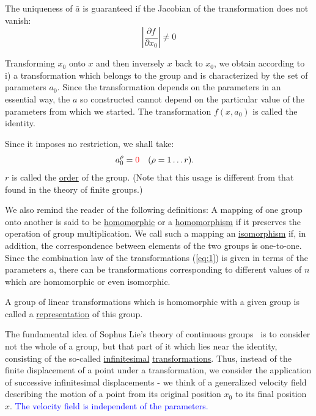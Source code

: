The uniqueness of \(\bar{a}\) is guaranteed if the Jacobian of the transformation does not vanish:
\begin{equation}\label{eq:4}
\left|\frac{\partial f}{\partial x_0}\right| \neq 0
\end{equation}

Transforming \(x_0\) onto \(x\) and then inversely \(x\) back to \(x_0\), we
obtain according to i) a transformation which belongs to the group and is
characterized by the set of parameters \(a_0\). Since the transformation
depends on the parameters in an essential way, the \(a\) so constructed cannot
depend on the particular value of the parameters from which we started. The
transformation \(f(x, a_0)\) is called the identity.

Since it imposes no restriction, we shall take:
\[
a_0^\rho=\textcolor{red}{0} \quad (\rho=1 \ldots r). \quad 
\]
\(r\) is called the \underline{order} of the group. (Note that this usage is
different from that found in the theory of finite groups.)

We also remind the reader of the following definitions: A mapping of one group
onto another is said to be \underline{homomorphic} or a
\underline{homomorphism} if it preserves the operation of group multiplication.
We call such a mapping an \underline{isomorphism} if, in addition, the
correspondence between elements of the two groups is one-to-one.  Since the
combination law of the transformations (\ref{eq:1}) is given in terms of the
parameters \(a\), there can be transformations corresponding to different
values of \(n\) which are homomorphic or even isomorphic.

A group of linear transformations which is homomorphic with a given group is called a
\underline{representation} of this group.

The fundamental idea of Sophus Lie's theory of continuous groups~\cite{Lie1893} is to consider
not the whole of a group, but that part of it which lies near the identity,
consisting of the so-called \underline{infinitesimal}
\underline{transformations}. Thus, instead of the finite displacement of a
point under a transformation, we consider the application of successive
infinitesimal displacements - we think of a generalized velocity field
describing the motion of a point from its original position \(x_0\) to its
final position \(x\).
\textcolor{blue}{The velocity field is independent of the parameters.}


